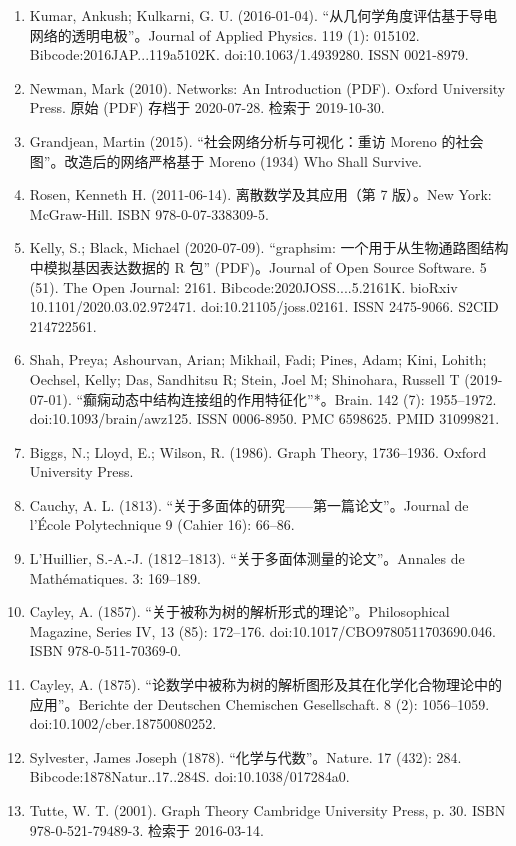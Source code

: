 \begin{enumerate}
\item Kumar, Ankush; Kulkarni, G. U. (2016-01-04). “从几何学角度评估基于导电网络的透明电极”。Journal of Applied Physics. 119 (1): 015102. Bibcode:2016JAP...119a5102K. doi:10.1063/1.4939280. ISSN 0021-8979.
\item Newman, Mark (2010). Networks: An Introduction (PDF). Oxford University Press. 原始 (PDF) 存档于 2020-07-28. 检索于 2019-10-30.
\item Grandjean, Martin (2015). “社会网络分析与可视化：重访 Moreno 的社会图”。改造后的网络严格基于 Moreno (1934) Who Shall Survive.
\item Rosen, Kenneth H. (2011-06-14). 离散数学及其应用（第 7 版）。New York: McGraw-Hill. ISBN 978-0-07-338309-5.
\item Kelly, S.; Black, Michael (2020-07-09). “graphsim: 一个用于从生物通路图结构中模拟基因表达数据的 R 包” (PDF)。Journal of Open Source Software. 5 (51). The Open Journal: 2161. Bibcode:2020JOSS....5.2161K. bioRxiv 10.1101/2020.03.02.972471. doi:10.21105/joss.02161. ISSN 2475-9066. S2CID 214722561.
\item Shah, Preya; Ashourvan, Arian; Mikhail, Fadi; Pines, Adam; Kini, Lohith; Oechsel, Kelly; Das, Sandhitsu R; Stein, Joel M; Shinohara, Russell T (2019-07-01). “癫痫动态中结构连接组的作用特征化”*。Brain. 142 (7): 1955–1972. doi:10.1093/brain/awz125. ISSN 0006-8950. PMC 6598625. PMID 31099821.
\item Biggs, N.; Lloyd, E.; Wilson, R. (1986). Graph Theory, 1736–1936. Oxford University Press.
\item Cauchy, A. L. (1813). “关于多面体的研究——第一篇论文”。Journal de l'École Polytechnique 9 (Cahier 16): 66–86.
\item L'Huillier, S.-A.-J. (1812–1813). “关于多面体测量的论文”。Annales de Mathématiques. 3: 169–189.
\item Cayley, A. (1857). “关于被称为树的解析形式的理论”。Philosophical Magazine, Series IV, 13 (85): 172–176. doi:10.1017/CBO9780511703690.046. ISBN 978-0-511-70369-0.
\item  Cayley, A. (1875). “论数学中被称为树的解析图形及其在化学化合物理论中的应用”。Berichte der Deutschen Chemischen Gesellschaft. 8 (2): 1056–1059. doi:10.1002/cber.18750080252.
\item Sylvester, James Joseph (1878). “化学与代数”。Nature. 17 (432): 284. Bibcode:1878Natur..17..284S. doi:10.1038/017284a0.
\item Tutte, W. T. (2001). Graph Theory Cambridge University Press, p. 30. ISBN 978-0-521-79489-3. 检索于 2016-03-14.

\end{enumerate}
